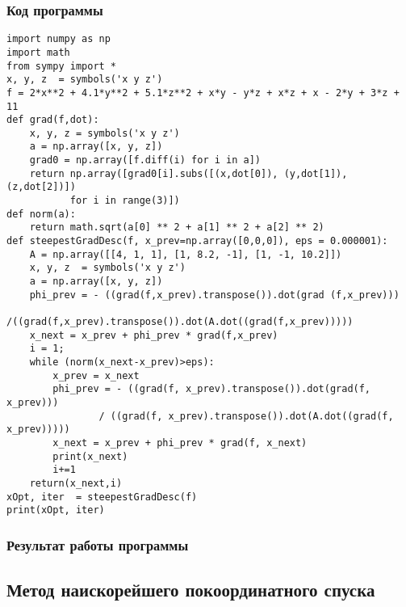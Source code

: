 \documentclass[12pt,a4paper]{article}
\begin{document}
\subsubsection{Код программы}
\begin{verbatim}
import numpy as np
import math
from sympy import *
x, y, z  = symbols('x y z')
f = 2*x**2 + 4.1*y**2 + 5.1*z**2 + x*y - y*z + x*z + x - 2*y + 3*z + 11
def grad(f,dot):
    x, y, z = symbols('x y z')
    a = np.array([x, y, z])
    grad0 = np.array([f.diff(i) for i in a])
    return np.array([grad0[i].subs([(x,dot[0]), (y,dot[1]), (z,dot[2])]) 
           for i in range(3)])
def norm(a):
    return math.sqrt(a[0] ** 2 + a[1] ** 2 + a[2] ** 2)
def steepestGradDesc(f, x_prev=np.array([0,0,0]), eps = 0.000001):
    A = np.array([[4, 1, 1], [1, 8.2, -1], [1, -1, 10.2]])
    x, y, z  = symbols('x y z')
    a = np.array([x, y, z])
    phi_prev = - ((grad(f,x_prev).transpose()).dot(grad (f,x_prev)))
            /((grad(f,x_prev).transpose()).dot(A.dot((grad(f,x_prev)))))
    x_next = x_prev + phi_prev * grad(f,x_prev)
    i = 1;
    while (norm(x_next-x_prev)>eps):
        x_prev = x_next
        phi_prev = - ((grad(f, x_prev).transpose()).dot(grad(f, x_prev))) 
                / ((grad(f, x_prev).transpose()).dot(A.dot((grad(f, x_prev)))))
        x_next = x_prev + phi_prev * grad(f, x_next)
        print(x_next)
        i+=1
    return(x_next,i)
xOpt, iter  = steepestGradDesc(f)
print(xOpt, iter)
\end{verbatim}
\subsubsection{Результат работы программы}
\subsection{Метод наискорейшего покоординатного спуска}
\end{document}
